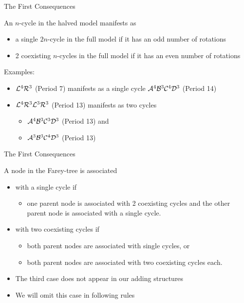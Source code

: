 \begin{frame}{The First Consequences}
	\begin{theorem}
		An $n$-cycle in the halved model manifests as
		\begin{itemize}
			\item a single $2n$-cycle in the full model if it has an odd number of rotations
			\item 2 coexisting $n$-cycles in the full model if it has an even number of rotations
		\end{itemize}
	\end{theorem}
	\pause
	Examples:
	\begin{itemize}
		\item $\mathcal{L}^4\mathcal{R}^3$ (Period 7) manifests as a single cycle $\mathcal{A}^4\mathcal{B}^3\mathcal{C}^4\mathcal{D}^3$ (Period 14)
		\item $\mathcal{L}^4\mathcal{R}^3\mathcal{L}^3\mathcal{R}^3$ (Period 13) manifests as two cycles
		      \begin{itemize}
			      \item $\mathcal{A}^4\mathcal{B}^3\mathcal{C}^3\mathcal{D}^3$ (Period 13) and
			      \item $\mathcal{A}^3\mathcal{B}^3\mathcal{C}^4\mathcal{D}^3$ (Period 13)
		      \end{itemize}
	\end{itemize}
\end{frame}

\begin{frame}{The First Consequences}
	\vspace{-1em}
	\begin{theorem}
		A node in the Farey-tree is associated
		\begin{itemize}
			\item with a single cycle if
			      \begin{itemize}
				      \item one parent node is associated with 2 coexisting cycles and the other parent node is associated with a single cycle.
			      \end{itemize}
			      \pause
			\item with two coexisting cycles if
			      \begin{itemize}
				      \item both parent nodes are associated with single cycles, or
				      \item both parent nodes are associated with two coexisting cycles each.
			      \end{itemize}
		\end{itemize}
	\end{theorem}
	\pause
	\begin{itemize}
		\item The third case does not appear in our adding structures
		\item We will omit this case in following rules
	\end{itemize}
\end{frame}

